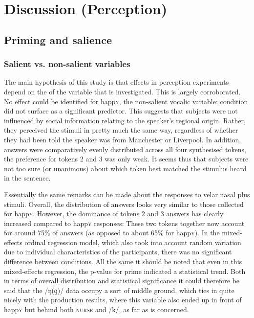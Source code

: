 	\chapter{Discussion (Perception)}
	\label{ch.perc_disc}

	\section{Priming and salience}
		\label{sec.perc_res.disc.salience}

		\subsection{Salient vs. non-salient variables}
		
The main hypothesis of this study is that  effects in perception experiments depend on the  of the variable that is investigated.
This is largely corroborated.
No  effect could be identified for happ\textsc{y}, the non-salient vocalic variable:  condition did not surface as a significant predictor.
This suggests that subjects were not influenced by social information relating to the speaker's regional origin.
Rather, they perceived the stimuli in pretty much the same way, regardless of whether they had been told the speaker was from Manchester or Liverpool.
In addition, answers were comparatively evenly distributed across all four synthesised tokens, the preference for tokens 2 and 3 was only weak.
It seems thus that subjects were not too sure (or unanimous) about which token best matched the stimulus heard in the sentence.

Essentially the same remarks can be made about the responses to velar nasal plus stimuli.
Overall, the distribution of answers looks very similar to those collected for happ\textsc{y}.
However, the dominance of tokens 2 and 3 answers has clearly increased compared to happ\textsc{y} responses: These two tokens together now account for around 75\% of answers (as opposed to about 65\% for happ\textsc{y}).
In the mixed-effects ordinal regression model, which also took into account random variation due to individual characteristics of the participants, there was no significant difference between  conditions.
All the same it should be noted that even in this mixed-effects regression, the p-value for prime indicated a statistical trend.
Both in terms of overall distribution and statistical significance it could therefore be said that the /ŋ(ɡ)/ data occupy a sort of middle ground, which ties in quite nicely with the production results, where this variable also ended up in front of happ\textsc{y} but behind both \textsc{nurse} and /k/, as far as  is concerned.

